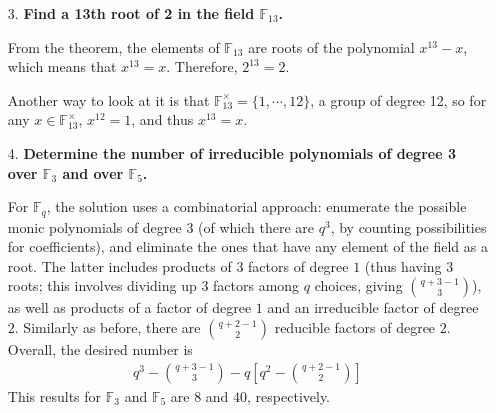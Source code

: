 \documentclass[a4paper,12pt]{article}
\begin{document}
\begin{enumerate}
    \item[3.]
        \boldmath
        \textbf{Find a 13th root of 2 in the field $\mathbb{F}_{13}$.} \par
        \unboldmath
        \iffalse
        $\mathbb{F}_{13}$ is simply $\mathbb{Z}/13\mathbb{Z}$, because since the number of elements is prime, no two elements multiplied together give $0$ modulo 13. This also implies that every element generates $\mathbb{F}_{13}^\times$, and in particular, the only $x$ for which $x^{13} = 2$ is $x = 2$.
        \fi
        From the theorem, the elements of $\mathbb{F}_{13}$ are roots of the polynomial $x^{13} - x$, which means that $x^{13} = x$. Therefore, $2^{13} = 2$. \par
        Another way to look at it is that $\mathbb{F}_{13}^\times = \{ 1, \cdots, 12 \}$, a group of degree 12, so for any $x \in \mathbb{F}_{13}^\times$, $x^{12} = 1$, and thus $x^{13} = x$.

    \item[4.]
        \boldmath
        \textbf{Determine the number of irreducible polynomials of degree 3 over $\mathbb{F}_3$ and over $\mathbb{F}_5$.} \par
        \unboldmath
        For $\mathbb{F}_q$, the solution uses a combinatorial approach: enumerate the possible monic polynomials of degree $3$ (of which there are $q^3$, by counting possibilities for coefficients), and eliminate the ones that have any element of the field as a root. The latter includes products of $3$ factors of degree $1$ (thus having $3$ roots; this involves dividing up $3$ factors among $q$ choices, giving $\binom{q + 3 - 1}{3}$), as well as products of a factor of degree $1$ and an irreducible factor of degree $2$. Similarly as before, there are $\binom{q + 2 - 1}{2}$ reducible factors of degree $2$. Overall, the desired number is
        \begin{align*}
            q^3 - \binom{q + 3 - 1}{3} - q \left[ q^2 - \binom{q + 2 - 1}{2} \right]
        \end{align*}
        This results for $\mathbb{F}_3$ and $\mathbb{F}_5$ are $8$ and $40$, respectively.


\end{enumerate}
\end{document}
